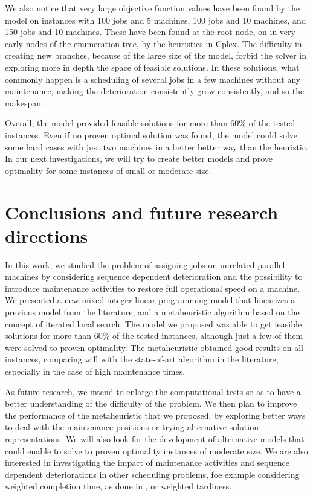 \documentclass[a4paper,11pt]{article}
\begin{document}
We also notice that very large objective function values have been found by the model on instances with 100 jobs and 5 machines, 100 jobs and 10 machines, and 150 jobs and 10 machines. These have been found at the root node, on in very early nodes of the enumeration tree, by the heuristics in Cplex. The difficulty in creating new branches, because of the large size of the model, forbid the solver in exploring more in depth the space of feasible solutions. In these solutions, what commonly happen is a scheduling of several jobs in a few machines without any maintenance, making the deterioration consistently grow consistently, and so the makespan.

Overall, the model provided feasible solutions for more than $60\%$ of the tested instances. Even if no proven optimal solution was found, the model could solve some hard cases with just two machines in a better better way than the heuristic. In our next investigations, we will try to create better models and prove optimality for some instances of small or moderate size.

\section{Conclusions and future research directions}\label{sec:conclusions}%
%
In this work, we studied the problem of assigning jobs on unrelated parallel machines by considering sequence dependent deterioration and the possibility to introduce maintenance activities to restore full operational speed on a machine.  We presented a new mixed integer linear programming model that linearizes a previous model from the literature, and a metaheuristic algorithm based on the concept of iterated local search.
The model we proposed was able to get feasible solutions for more than $60\%$ of the tested instances, although just a few of them were solved to proven optimality. 
The metaheuristic obtained good results on all instances, comparing will with the state-of-art  algorithm in the literature, especially in the case of high maintenance times. 

As future research, we intend to enlarge the computational tests so as to have a better understanding of the difficulty of the problem. We then plan to improve the performance of the metaheuristic that we proposed, by exploring better ways to deal with the maintenance positions or trying alternative solution representations. We will also look for the development of alternative models that could enable to solve to proven optimality instances of moderate size. We are also interested in investigating the impact of maintenance activities and sequence dependent deteriorations in other scheduling problems, foe example considering weighted completion time, as done in \cite{kramer2019enhanced}, or weighted tardiness.

~\\


\end{document}

